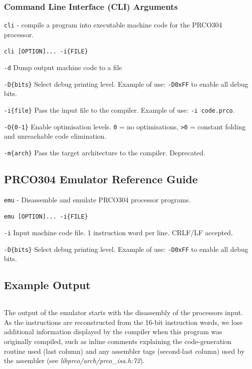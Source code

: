 \documentclass[11pt,a4paper]{report}
\newcommand{\scname}{PRCO304}
\begin{document}
\subsubsection*{Command Line Interface (CLI) Arguments}
\label{sect:compiler_cli}
\begin{description}[style=nextline]
\item [Name]
\verb|cli| - compile a program into executable machine code for the \scname{} processor.

\item[Synopsis]
\verb|cli [OPTION]... -i{FILE}|

\item [Description]
\verb|-d| Dump output machine code to a file

\verb|-D{bits}| Select debug printing level. Example of use: \verb|-D0xFF| to enable all debug bits. 

\verb|-i{file}| Pass the input file to the compiler. Example of use: \verb|-i code.prco|.

\verb|-O{0-1}| Enable optimisation levels. \verb|0| = no optimisations, \verb|>0| = constant folding and unreachable code elimination.

\verb|-m{arch}| Pass the target architecture to the compiler. Deprecated.

\end{description}


\subsection{\scname{} Emulator Reference Guide}
\label{sect:emulator_cli}
\begin{description}[style=nextline]
\item [Name]
\verb|emu| - Disassemble and emulate \scname{} processor programs.

\item[Synopsis]
\verb|emu [OPTION]... -i{FILE}|

\item [Description]
\verb|-i| Input machine code file. 1 instruction word per line. CRLF/LF accepted.

\verb|-D{bits}| Select debug printing level. Example of use: \verb|-D0xFF| to enable all debug bits. 
\end{description}


\subsection*{Example Output}
\inputminted{text}{emu_output.tex}
\scriptsize
The output of the emulator starts with the disassembly of the processors input. As the instructions are reconstructed from the 16-bit instruction words, we lose additional information displayed by the compiler when this program was originally compiled, such as inline comments explaining the code-generation routine used (last column) and any assembler tags (second-last column) used by the assembler (see \textit{libprco/arch/prco\_isa.h:72}).
\end{document}
